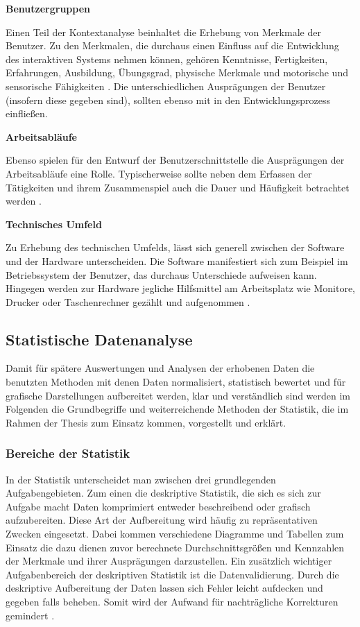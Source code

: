 \textbf{Benutzergruppen}

Einen Teil der Kontextanalyse beinhaltet die Erhebung von Merkmale der Benutzer. Zu den Merkmalen, die durchaus einen Einfluss auf die Entwicklung des interaktiven Systems nehmen können, gehören Kenntnisse, Fertigkeiten, Erfahrungen, Ausbildung, Übungsgrad, physische Merkmale und motorische und sensorische Fähigkeiten \citep[vgl.][28]{Ecker2015}. Die unterschiedlichen Ausprägungen der Benutzer (insofern diese gegeben sind), sollten ebenso mit in den Entwicklungsprozess einfließen.

\textbf{Arbeitsabläufe}

Ebenso spielen für den Entwurf der Benutzerschnittstelle die Ausprägungen der Arbeitsabläufe eine Rolle. Typischerweise sollte neben dem Erfassen der Tätigkeiten und ihrem Zusammenspiel auch die Dauer und Häufigkeit betrachtet werden \citep[vgl.][28]{Ecker2015}.

\textbf{Technisches Umfeld}

Zu Erhebung des technischen Umfelds, lässt sich generell zwischen der Software und der Hardware unterscheiden. Die Software manifestiert sich zum Beispiel im Betriebssystem der Benutzer, das durchaus Unterschiede aufweisen kann. Hingegen werden zur Hardware jegliche Hilfsmittel am Arbeitsplatz wie Monitore, Drucker oder Taschenrechner gezählt und aufgenommen \citep[vgl.][28]{Ecker2015}.

\subsection{Statistische Datenanalyse}
Damit für spätere Auswertungen und Analysen der erhobenen Daten die benutzten Methoden mit denen Daten normalisiert, statistisch bewertet und für grafische Darstellungen aufbereitet werden, klar und verständlich sind werden im Folgenden die Grundbegriffe und weiterreichende Methoden der Statistik, die im Rahmen der Thesis zum Einsatz kommen, vorgestellt und erklärt.

\subsubsection{Bereiche der Statistik}
In der Statistik unterscheidet man zwischen drei grundlegenden Aufgabengebieten. Zum einen die deskriptive Statistik, die sich es sich zur Aufgabe macht Daten komprimiert entweder beschreibend oder grafisch aufzubereiten. Diese Art der Aufbereitung wird häufig zu repräsentativen Zwecken eingesetzt. Dabei kommen verschiedene Diagramme und Tabellen zum Einsatz die dazu dienen zuvor berechnete Durchschnittsgrößen und Kennzahlen der Merkmale und ihrer Ausprägungen darzustellen. Ein zusätzlich wichtiger Aufgabenbereich der deskriptiven Statistik ist die Datenvalidierung. Durch die deskriptive Aufbereitung der Daten lassen sich Fehler leicht aufdecken und gegeben falls beheben. Somit wird der Aufwand für nachträgliche Korrekturen gemindert \citep[vgl.][10\psq]{Fahrmeir2016}.


